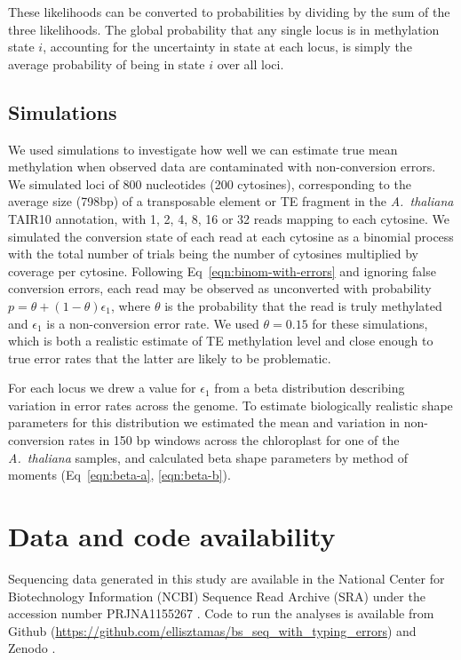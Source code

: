 \documentclass[10pt,letterpaper]{article}
\begin{document}
These likelihoods can be converted to probabilities by dividing by the sum of the three likelihoods.
The global probability that any single locus is in methylation state $i$, accounting for the uncertainty in state at each locus, is simply the average probability of being in state $i$ over all loci.

\subsection*{Simulations}

We used simulations to investigate how well we can estimate true mean methylation when observed data are contaminated with non-conversion errors.
We simulated loci of 800 nucleotides (200 cytosines), corresponding to the average size (798bp) of a transposable element or TE fragment in the \textit{A.~thaliana} TAIR10 annotation, with 1, 2, 4, 8, 16 or 32 reads mapping to each cytosine.
We simulated the conversion state of each read at each cytosine as a binomial process with the total number of trials being the number of cytosines multiplied by coverage per cytosine.
Following Eq~\ref{eqn:binom-with-errors} and ignoring false conversion errors, each read may be observed as unconverted with probability $p=\theta + (1-\theta)\epsilon_1$, where $\theta$ is the probability that the read is truly methylated and $\epsilon_1$ is a non-conversion error rate.
We used $\theta=0.15$ for these simulations, which is both a realistic estimate of TE methylation level \cite{dubin2015dna} and close enough to true error rates that the latter are likely to be problematic.

For each locus we drew a value for $\epsilon_1$ from a beta distribution describing variation in error rates across the genome.
To estimate biologically realistic shape parameters for this distribution we estimated the mean and variation in non-conversion rates in 150 bp windows across the chloroplast for one of the \emph{A.~thaliana} samples, and calculated beta shape parameters by method of moments (Eq~\ref{eqn:beta-a}, \ref{eqn:beta-b}).

\section*{Data and code availability}

Sequencing data generated in this study are available in the National Center for Biotechnology Information (NCBI) Sequence Read Archive (SRA) under the accession number PRJNA1155267 \cite{ellis2023datafrom}.
Code to run the analyses is available from Github (\url{https://github.com/ellisztamas/bs_seq_with_typing_errors}) and Zenodo \cite{ellis2023codefrom}.
\end{document}
